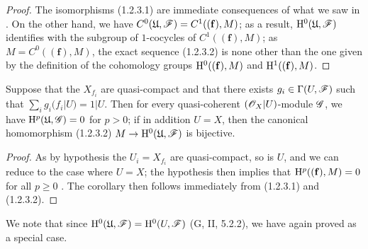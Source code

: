 \begin{proof}
\label{proof-III.1.2.3}
The isomorphisms (1.2.3.1) are immediate consequences of what we saw in .
On the other hand, we have $C^0(\mathfrak{U},\mathscr{F})=C^1((\mathbf{f}),M)$; as a result, $\mathrm{H}^0(\mathfrak{U},\mathscr{F})$ identifies with the subgroup of $1$-cocycles of $C^1((\mathbf{f}),M)$; as $M=C^0((\mathbf{f}),M)$, the exact sequence (1.2.3.2) is none other than the one given by the definition of the cohomology groups $\mathrm{H}^0((\mathbf{f}),M)$ and $\mathrm{H}^1((\mathbf{f}),M)$.
\end{proof}

\begin{corollary}[1.2.4]
\label{III.1.2.4}
Suppose that the $X_{f_i}$ are quasi-compact and that there exists $g_i\in\Gamma(U,\mathscr{F})$ such that $\sum_i g_i(f_i|U)=1|U$.
Then for every quasi-coherent $(\mathscr{O}_X|U)$-module $\mathscr{G}$, we have $\mathrm{H}^p(\mathfrak{U},\mathscr{G})=0$ for $p>0$; if in addition $U=X$, then the canonical homomorphism (1.2.3.2) $M\to\HH^0(\mathfrak{U},\sh{F})$ is bijective.
\end{corollary}

\begin{proof}
\label{proof-III.1.2.4}
As by hypothesis the $U_i=X_{f_i}$ are quasi-compact, so is $U$, and we can reduce to the case where $U=X$; the hypothesis then implies that $\mathrm{H}^p((\mathbf{f}),M)=0$ for all $p\geq 0$ .
The corollary then follows immediately from (1.2.3.1) and (1.2.3.2).
\end{proof}

We note that since $\mathrm{H}^0(\mathfrak{U},\mathscr{F})=\mathrm{H}^0(U,\mathscr{F})$ (G, II, 5.2.2), we have again proved  as a special case.

